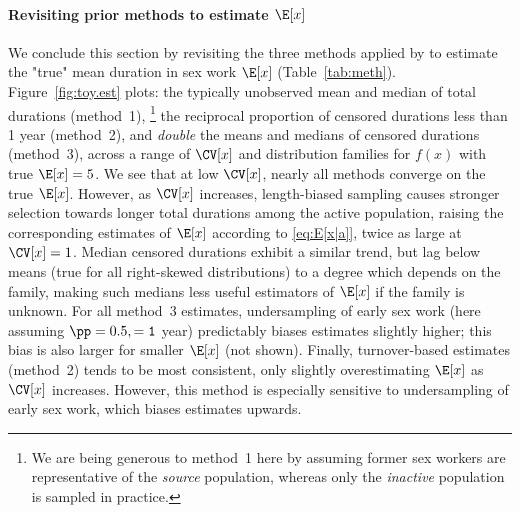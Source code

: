 \paragraph{Revisiting prior methods to estimate $\E[x]$}
We conclude this section by revisiting
the three methods applied by \citet{Fazito2012}
to estimate the "true" mean duration in sex work $\E[x]$ (Table~\ref{tab:meth}).
Figure~\ref{fig:toy.est} plots:
the typically unobserved mean and median of total durations (method~1),%
\footnote{We are being generous to method~1 here by assuming
  former sex workers are representative of the \emph{source} population,
  whereas only the \emph{inactive} population is sampled in practice.}
the reciprocal proportion of censored durations less than 1 year (method~2),
and \emph{double} the means and medians of censored durations (method~3),
across a range of $\CV[x]$ and distribution families for $f(x)$ with true $\E[x] = 5$.
We see that at low $\CV[x]$, nearly all methods converge on the true $\E[x]$.
However, as $\CV[x]$ increases,
length-biased sampling causes stronger selection towards
longer total durations among the active population,
raising the corresponding estimates of $\E[x]$ according to \eqref{eq:E[x|a]},
\eg twice as large at $\CV[x] = 1$.
Median censored durations exhibit a similar trend,
but lag below means (true for all right-skewed distributions)
to a degree which depends on the family,
making such medians less useful estimators of $\E[x]$ if the family is unknown.
For all method~3 estimates, undersampling of early sex work
(here assuming $\pp = 0.5, \tt = 1$ year)
predictably biases estimates slightly higher;
this bias is also larger for smaller $\E[x]$ (not shown).
Finally, turnover-based estimates (method~2) tends to be most consistent,
only slightly overestimating $\E[x]$ as $\CV[x]$ increases.
However, this method is especially sensitive to
undersampling of early sex work, which biases estimates upwards.
